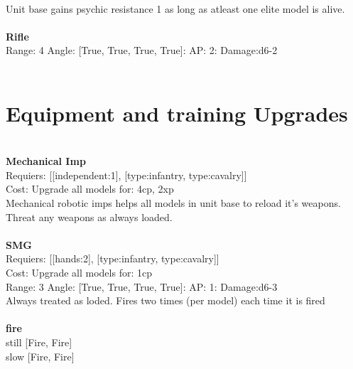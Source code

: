 \ \\
Unit base gains psychic resistance 1 as long as atleast one elite model is alive.\\ 

\ \\
{\bf Rifle } \\



Range: 4  Angle: [True, True, True, True]: AP: 2: Damage:d6-2 \\




 
\ \\

\section{Equipment and training Upgrades}\ \\
{\bf Mechanical Imp } \\

Requiers: [[independent:1], [type:infantry, type:cavalry]] \\
Cost: Upgrade all models for: 4cp, 2xp \\
Mechanical robotic imps helps all models in unit base to reload it's weapons. Threat any weapons as always loaded.\\ 









\ \\
{\bf SMG } \\

Requiers: [[hands:2], [type:infantry, type:cavalry]] \\
Cost: Upgrade all models for: 1cp \\


Range: 3  Angle: [True, True, True, True]: AP: 1: Damage:d6-3 \\
Always treated as loded. Fires two times (per model) each time it is fired\\ 







\ \\ {\bf fire } \\
still [Fire, Fire] \\
slow [Fire, Fire] \\

